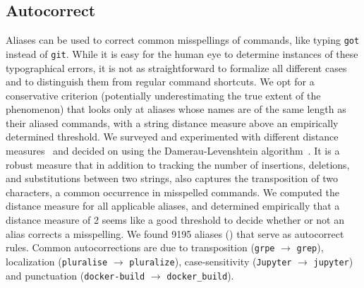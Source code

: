 \subsection{Autocorrect}
Aliases can be used to correct common misspellings of commands, like typing \verb|got| instead of \verb|git|.
While it is easy for the human eye to determine instances of these typographical errors, it is not as straightforward to formalize all different cases and to distinguish them from regular command shortcuts.
We opt for a conservative criterion (potentially underestimating the true extent of the phenomenon) that looks only at aliases whose names are of the same length as their aliased commands, with a string distance measure above an empirically determined threshold.
We surveyed and experimented with different distance measures~\cite{navarro:01} and decided on using the Damerau-Levenshtein algorithm~\cite{damerau:64}.
It is a robust measure that in addition to tracking the number of insertions, deletions, and substitutions between two strings, also captures the transposition of two characters, a common occurrence in misspelled commands.
We computed the distance measure for all applicable aliases, and determined empirically that a distance measure of 2 seems like a good threshold to decide whether or not an alias corrects a misspelling.
We found \num{9195} aliases () that serve as autocorrect rules.
Common autocorrections are due to transposition (\verb|grpe| $\rightarrow$ \verb|grep|), localization (\verb|pluralise| $\rightarrow$ \verb|pluralize|), case-sensitivity (\verb|Jupyter| $\rightarrow$ \verb|jupyter|) and punctuation (\verb|docker-build| $\rightarrow$ \verb|docker_build|).


%

%

%

%

%

%

